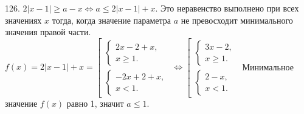 126. $2|x-1|\geqslant a-x\Leftrightarrow a\leqslant  2|x-1|+x.$ Это неравенство выполнено при всех значениях $x$ тогда, когда значение параметра $a$ не превосходит минимального значения правой части. $f(x)=2|x-1|+x=\left[\begin{array}{l}\begin{cases}2x-2+x,\\ x\geqslant 1. \end{cases}\\ \begin{cases}-2x+2+x,\\ x< 1. \end{cases}\end{array}\right.\Leftrightarrow\left[\begin{array}{l}\begin{cases}3x-2,\\ x\geqslant 1. \end{cases}\\ \begin{cases}2-x,\\ x<1. \end{cases}\end{array}\right.$ Минимальное значение $f(x)$ равно 1, значит $a\leqslant1.$\\
